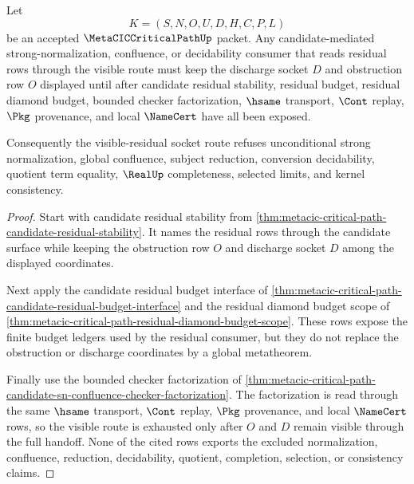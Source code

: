 \begin{theorem}
\label{thm:metacic-critical-path-visible-residual-socket-exhaustion}
Let
$$
K=(S,N,O,U,D,H,C,P,L)
$$
be an accepted $\MetaCICCriticalPathUp$ packet. Any candidate-mediated strong-normalization, confluence, or decidability consumer that reads residual rows through the visible route must keep the discharge socket $D$ and obstruction row $O$ displayed until after candidate residual stability, residual budget, residual diamond budget, bounded checker factorization, $\hsame$ transport, $\Cont$ replay, $\Pkg$ provenance, and local $\NameCert$ have all been exposed.

Consequently the visible-residual socket route refuses unconditional strong normalization, global confluence, subject reduction, conversion decidability, quotient term equality, $\RealUp$ completeness, selected limits, and kernel consistency.
\end{theorem}
\begin{proof}
Start with candidate residual stability from \autoref{thm:metacic-critical-path-candidate-residual-stability}. It names the residual rows through the candidate surface while keeping the obstruction row $O$ and discharge socket $D$ among the displayed coordinates.

Next apply the candidate residual budget interface of \autoref{thm:metacic-critical-path-candidate-residual-budget-interface} and the residual diamond budget scope of \autoref{thm:metacic-critical-path-residual-diamond-budget-scope}. These rows expose the finite budget ledgers used by the residual consumer, but they do not replace the obstruction or discharge coordinates by a global metatheorem.

Finally use the bounded checker factorization of \autoref{thm:metacic-critical-path-candidate-sn-confluence-checker-factorization}. The factorization is read through the same $\hsame$ transport, $\Cont$ replay, $\Pkg$ provenance, and local $\NameCert$ rows, so the visible route is exhausted only after $O$ and $D$ remain visible through the full handoff. None of the cited rows exports the excluded normalization, confluence, reduction, decidability, quotient, completion, selection, or consistency claims.
\end{proof}

